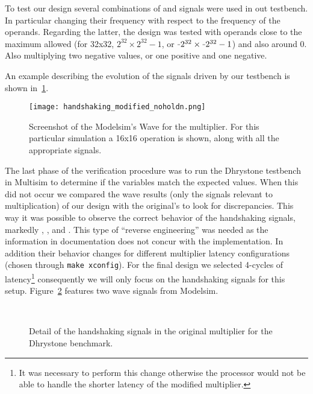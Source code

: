 To test our design several combinations of \holdn and \start signals were used in out testbench. In particular changing their frequency with respect to the frequency of the operands.
Regarding the latter, the design was tested with operands close to the maximum allowed (\eg for 32x32, $2^{32} \times 2^{32}-1$, or $\unaryminus 2^{32} \times \unaryminus 2^{32}-1$) and also around 0. Also multiplying two negative values, or one positive and one negative.

An example describing the evolution of the signals driven by our testbench is shown in~\ref{fig:mul32_wave}.

\begin{figure}[H]
\centering
\texttt{[image: handshaking\_modified\_noholdn.png]}
\caption{Screenshot of the Modelsim's Wave for the multiplier. For this particular simulation a 16x16 operation is shown, along with all the appropriate signals.}
\label{fig:mul32_wave}
\end{figure}

The last phase of the verification procedure was to run the Dhrystone testbench in Multisim to determine if the variables match the expected values. When this did not occur we compared the wave results (only the signals relevant to multiplication) of our design with the original's to look for discrepancies. This way it was possible to observe the correct behavior of the handshaking signals, markedly \start, \holdn, \ready and \nready. This type of ``reverse engineering'' was needed as the information in documentation does not concur with the implementation. In addition their behavior changes for different multiplier latency configurations (chosen through \texttt{make xconfig}). For the final design we selected 4-cycles of latency\footnote{It was necessary to perform this change otherwise the processor would not be able to handle the shorter latency of the modified multiplier.} consequently we will only focus on the handshaking signals for this setup. Figure~\ref{fig:handshake} features two wave signals from Modelsim.

\begin{figure}[H]
\centering
{}\\
\quad
\caption{Detail of the handshaking signals in the original multiplier for the Dhrystone benchmark.}
\label{fig:handshake}
\end{figure}

